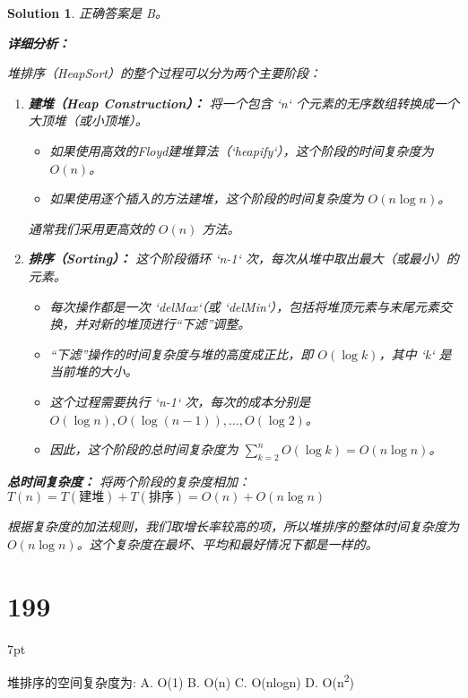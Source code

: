 \documentclass[UTF8]{report}
\newtheorem{solution}{Solution}
\theoremstyle{MyLineTheoremStyle} %
\theoremstyle{MyBlockTheoremStyle} %
\theoremstyle{MySubsubsectionStyle} %
\newenvironment{graybox}{%
        \def\FrameCommand{%
        \hspace{1pt}%
        {\color{gray}\small \vrule width 2pt}%
        {\color{graybox_color}\vrule width 4pt}%
        \colorbox{graybox_color}%
        }%
        \MakeFramed{\advance\hsize-\width\FrameRestore}%
        \noindent\hspace{-4.55pt}%
        \begin{adjustwidth}{}{7pt}%
        \vspace{2pt}\vspace{2pt}%
        }
        {%
        \vspace{2pt}\end{adjustwidth}\endMakeFramed%
        }
\begin{document}
\begin{solution}
正确答案是 B。

\textbf{详细分析：}

堆排序（HeapSort）的整个过程可以分为两个主要阶段：

\begin{enumerate}
    \item \textbf{建堆（Heap Construction）：}
    将一个包含 `n` 个元素的无序数组转换成一个大顶堆（或小顶堆）。
    \begin{itemize}
        \item 如果使用高效的Floyd建堆算法（`heapify`），这个阶段的时间复杂度为 $O(n)$。
        \item 如果使用逐个插入的方法建堆，这个阶段的时间复杂度为 $O(n \log n)$。
    \end{itemize}
    通常我们采用更高效的 $O(n)$ 方法。

    \item \textbf{排序（Sorting）：}
    这个阶段循环 `n-1` 次，每次从堆中取出最大（或最小）的元素。
    \begin{itemize}
        \item 每次操作都是一次 `delMax`（或 `delMin`），包括将堆顶元素与末尾元素交换，并对新的堆顶进行“下滤”调整。
        \item “下滤”操作的时间复杂度与堆的高度成正比，即 $O(\log k)$，其中 `k` 是当前堆的大小。
        \item 这个过程需要执行 `n-1` 次，每次的成本分别是 $O(\log n), O(\log(n-1)), \dots, O(\log 2)$。
        \item 因此，这个阶段的总时间复杂度为 $\sum_{k=2}^{n} O(\log k) = O(n \log n)$。
    \end{itemize}
\end{enumerate}

\textbf{总时间复杂度：}
将两个阶段的复杂度相加：
$T(n) = T(\text{建堆}) + T(\text{排序}) = O(n) + O(n \log n)$

根据复杂度的加法规则，我们取增长率较高的项，所以堆排序的整体时间复杂度为 $O(n \log n)$。这个复杂度在最坏、平均和最好情况下都是一样的。
\end{solution}

\section*{199}
\begin{graybox}
堆排序的空间复杂度为:
A. O(1)
B. O(n)
C. O(nlogn)
D. O(n\textsuperscript{2})
\end{graybox}
\end{document}
